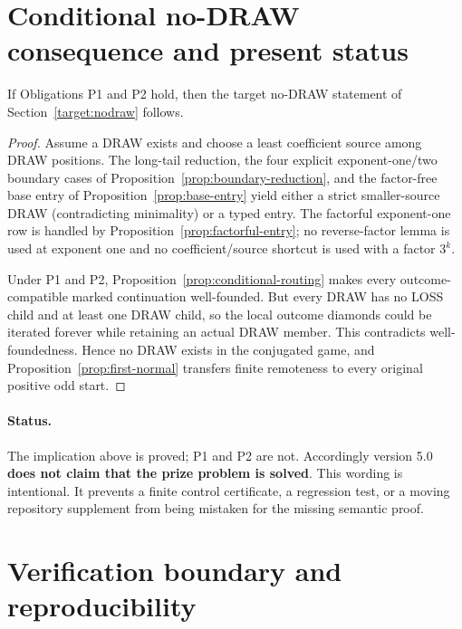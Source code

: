 \section{Conditional no-DRAW consequence and present status}

\begin{theorem}\label{thm:conditional}
If Obligations P1 and P2 hold, then the target no-DRAW statement of
Section~\ref{target:nodraw} follows.
\end{theorem}

\begin{proof}
Assume a DRAW exists and choose a least coefficient source among DRAW
positions.  The long-tail reduction, the four explicit exponent-one/two
boundary cases of Proposition~\ref{prop:boundary-reduction}, and the
factor-free base entry of Proposition~\ref{prop:base-entry} yield either a
strict smaller-source DRAW (contradicting minimality) or a typed entry.  The
factorful exponent-one row is handled by Proposition~\ref{prop:factorful-entry};
no reverse-factor lemma is used at exponent one and no coefficient/source
shortcut is used with a factor $3^k$.

Under P1 and P2, Proposition~\ref{prop:conditional-routing} makes every
outcome-compatible marked continuation well-founded.  But every DRAW has no
LOSS child and at least one DRAW child, so the local outcome diamonds could be
iterated forever while retaining an actual DRAW member.  This contradicts
well-foundedness.  Hence no DRAW exists in the conjugated game, and
Proposition~\ref{prop:first-normal} transfers finite remoteness to every
original positive odd start.
\end{proof}

\paragraph{Status.}
The implication above is proved; P1 and P2 are not.  Accordingly version 5.0
\textbf{does not claim that the prize problem is solved}.  This wording is
intentional.  It prevents a finite control certificate, a regression test, or
a moving repository supplement from being mistaken for the missing semantic
proof.

\section{Verification boundary and reproducibility}

